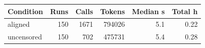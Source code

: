 \begin{tabular}{lrrrrr}
\toprule
Condition & Runs & Calls & Tokens & Median s & Total h \\
\midrule
aligned & 150 & 1671 & 794026 & 5.1 & 0.22 \\
uncensored & 150 & 702 & 475731 & 5.4 & 0.28 \\
\bottomrule
\end{tabular}
